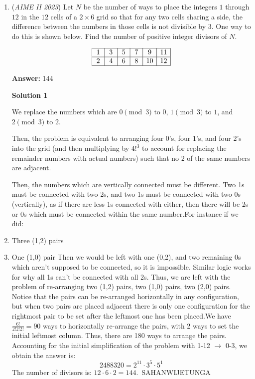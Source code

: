 \begin{enumerate}
	\item (\textit{AIME II 2023}) Let $N$ be the number of ways to place the integers $1$ through $12$ in the $12$ cells of a $2 \times 6$ grid so that for any two cells sharing a side, the difference between the numbers in those cells is not divisible by $3.$ One way to do this is shown below. Find the number of positive integer divisors of $N.$

 \[\begin{array}{|c|c|c|c|c|c|} \hline \,1\, & \,3\, & \,5\, & \,7\, & \,9\, & 11 \\ \hline \,2\, & \,4\, & \,6\, & \,8\, & 10 & 12 \\ \hline \end{array}\]

 \textbf{Answer: }144



\textbf{Solution 1}

We replace the numbers which are $0 \pmod 3$ to $0$, $1 \pmod 3$ to $1$, and $2 \pmod 3$ to $2$.

 Then, the problem is equivalent to arranging four $0$'s, four $1$'s, and four $2$'s into the grid (and then multiplying by $4!^3$ to account for replacing the remainder numbers with actual numbers) such that no 2 of the same numbers are adjacent. 

 Then, the numbers which are vertically connected must be different. Two 1s must be connected with two 2s, and two 1s must be connected with two 0s (vertically), as if there are less 1s connected with either, then there will be 2s or 0s which must be connected within the same number.For instance if we did:

 
        \item  Three (1,2) pairs 
        \item  One (1,0) pair Then we would be left with one (0,2), and two remaining 0s which aren't supposed to be connected, so it is impossible. Similar logic works for why all 1s can't be connected with all 2s. Thus, we are left with the problem of re-arranging two (1,2) pairs, two (1,0) pairs, two (2,0) pairs. Notice that the pairs can be re-arranged horizontally in any configuration, but when two pairs are placed adjacent there is only one configuration for the rightmost pair to be set after the leftmost one has been placed.We have $\frac{6!}{2!2!2!}=90$ ways to horizontally re-arrange the pairs, with 2 ways to set the initial leftmost column. Thus, there are 180 ways to arrange the pairs. Accounting for the initial simplification of the problem with 1-12 $\rightarrow$ 0-3, we obtain the answer is: 
 \[2488320=2^{11}\cdot3^5\cdot5^1\]The number of divisors is: $12\cdot6\cdot2=\boxed{144}.$~SAHANWIJETUNGA


\end{enumerate}
